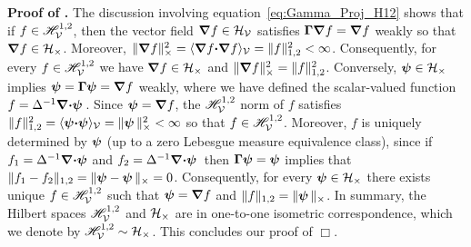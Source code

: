 \documentclass[amsa]{ipart}
\begin{document}
\textbf{Proof of .}\hspace{1ex}
%
The discussion involving equation~\eqref{eq:Gamma_Proj_H12} shows that 
if $f\in\Hs^{1,2}_{\Vc}$, then the vector field $\bnabla f\in\Hc_{\Vc}$
satisfies $\bGamma\bnabla f=\bnabla f$ 
weakly so that $\bnabla f\in\Hc_\times$. Moreover,
$\|\bnabla f\|_\times^2=\langle\bnabla f\bcdot\bnabla
f\rangle_{\Vc}=\|f\|_{1,2}^2<\infty$. Consequently, for every    
$f\in\Hs^{1,2}_{\Vc}$ we have $\bnabla f\in\Hc_\times$ and $\|\bnabla
f\|_\times^2=\|f\|_{1,2}^2$. Conversely, $\vecpsi\in\Hc_\times$ implies 
$\vecpsi=\bGamma\vecpsi=\bnabla f$ weakly, where we have defined the
scalar-valued function $f=\Delta^{-1}\bnabla \bcdot\vecpsi\,$. Since
$\vecpsi=\bnabla f$, the 
$\Hs^{1,2}_{\Vc}$ norm of $f$ satisfies
$\|f\|_{1,2}^2=\langle\vecpsi\bcdot\vecpsi\rangle_{\Vc}=\|\vecpsi\,\|_\times^2<\infty$ so that
$f\in\Hs^{1,2}_{\Vc}$. Moreover, $f$ is uniquely determined by $\vecpsi$ (up
to a zero Lebesgue measure equivalence class), since if $f_1=\Delta^{-1}\bnabla
\bcdot\vecpsi$ and $f_2=\Delta^{-1}\bnabla \bcdot\vecpsi\,$ then
$\bGamma\vecpsi=\vecpsi$ implies that
$\|f_1-f_2\|_{1,2}=\|\vecpsi-\vecpsi\,\|_\times=0$. Consequently, for every
$\vecpsi\in\Hc_\times$ there exists unique $f\in\Hs^{1,2}_{\Vc}$ such that
$\vecpsi=\bnabla f$ and $\|f\|_{1,2}=\|\vecpsi\,\|_\times$.  In summary, the
Hilbert spaces $\Hs^{1,2}_{\Vc}$ and $\Hc_\times$ are in one-to-one
isometric correspondence, which we denote by
$\Hs^{1,2}_{\Vc}\sim\Hc_\times$. This concludes our proof of
 $\Box$.
\end{document}
